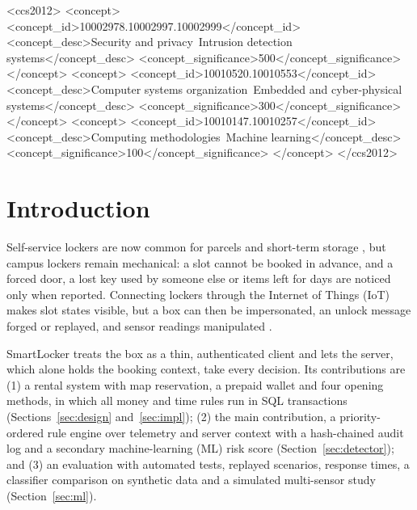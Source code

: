 \documentclass[sigconf,screen]{acmart}
\begin{document}
\begin{CCSXML}
<ccs2012>
 <concept>
  <concept_id>10002978.10002997.10002999</concept_id>
  <concept_desc>Security and privacy~Intrusion detection systems</concept_desc>
  <concept_significance>500</concept_significance>
 </concept>
 <concept>
  <concept_id>10010520.10010553</concept_id>
  <concept_desc>Computer systems organization~Embedded and cyber-physical systems</concept_desc>
  <concept_significance>300</concept_significance>
 </concept>
 <concept>
  <concept_id>10010147.10010257</concept_id>
  <concept_desc>Computing methodologies~Machine learning</concept_desc>
  <concept_significance>100</concept_significance>
 </concept>
</ccs2012>
\end{CCSXML}



\maketitle

\section{Introduction}

Self-service lockers are now common for parcels and short-term storage \cite{iwan2016parcel}, but campus lockers
remain mechanical: a slot cannot be booked in advance, and a forced door, a lost key used by someone else or items
left for days are noticed only when reported. Connecting lockers through the Internet of Things (IoT)
\cite{alfuqaha2015iot} makes slot states visible, but a box can then be impersonated, an unlock message forged or
replayed, and sensor readings manipulated \cite{sicari2015security,roman2013features}.

SmartLocker treats the box as a thin, authenticated client and lets the server, which alone holds the booking context,
take every decision. Its contributions are (1) a rental system with map reservation, a prepaid wallet and four
opening methods, in which all money and time rules run in SQL transactions (Sections~\ref{sec:design}
and~\ref{sec:impl}); (2) the main contribution, a priority-ordered rule engine over telemetry and server context with a
hash-chained audit log and a secondary machine-learning (ML) risk score (Section~\ref{sec:detector}); and (3) an
evaluation with automated tests, replayed
scenarios, response times, a classifier comparison on synthetic data and a simulated multi-sensor study
(Section~\ref{sec:ml}).
\end{document}
